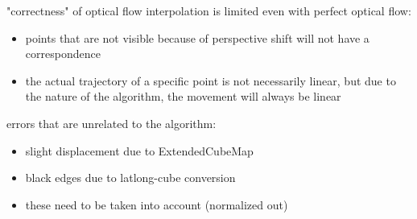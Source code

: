 "correctness" of optical flow interpolation is limited even with perfect optical flow:
\begin{itemize}
   \item points that are not visible because of perspective shift will not have a correspondence
   \item the actual trajectory of a specific point is not necessarily linear, but due to the nature of the algorithm, the movement will always be linear
\end{itemize}
errors that are unrelated to the algorithm:
\begin{itemize}
  \item slight displacement due to ExtendedCubeMap
  \item black edges due to latlong-cube conversion
  \item these need to be taken into account (normalized out)
\end{itemize}

